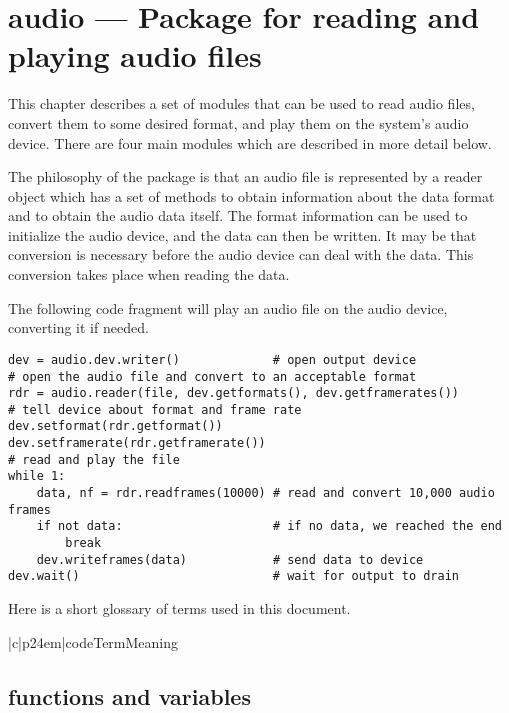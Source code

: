 \chapter{audio ---
	 Package for reading and playing audio files}


This chapter describes a set of modules that can be used to read audio
files, convert them to some desired format, and play them on the
system's audio device.  There are four main modules which are
described in more detail below.

The philosophy of the package is that an audio file is represented by
a reader object which has a set of methods to obtain information about
the data format and to obtain the audio data itself.  The format
information can be used to initialize the audio device, and the data
can then be written.  It may be that conversion is necessary before
the audio device can deal with the data.  This conversion takes place
when reading the data.

The following code fragment will play an audio file on the audio
device, converting it if needed.

\begin{verbatim}
dev = audio.dev.writer()             # open output device
# open the audio file and convert to an acceptable format
rdr = audio.reader(file, dev.getformats(), dev.getframerates())
# tell device about format and frame rate
dev.setformat(rdr.getformat())
dev.setframerate(rdr.getframerate())
# read and play the file
while 1:
    data, nf = rdr.readframes(10000) # read and convert 10,000 audio frames
    if not data:                     # if no data, we reached the end
        break
    dev.writeframes(data)            # send data to device
dev.wait()                           # wait for output to drain
\end{verbatim}

Here is a short glossary of terms used in this document.

\begin{tableii}{|c|p{24em}|}{code}{Term}{Meaning}
\end{tableii}

\section{ functions and variables}

